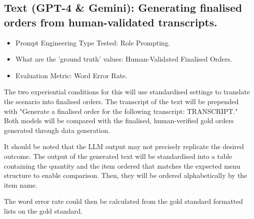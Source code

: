 
\subsection{Text (GPT-4 \& Gemini): Generating finalised orders from human-validated transcripts.}

\begin{itemize}
    \item Prompt Engineering Type Tested: Role Prompting.
    \item What are the 'ground truth' values: Human-Validated Finalised Orders.
    \item Evaluation Metric: Word Error Rate.
\end{itemize}

The two experiential conditions for this will use standardised settings to translate the scenario into finalised orders. The transcript of the text will be prepended with "Generate a finalised order for the following transcript: TRANSCRIPT." Both models will be compared with the finalised, human-verified gold orders generated through data generation. 

It should be noted that the LLM output may not precisely replicate the desired outcome. The output of the generated text will be standardised into a table containing the quantity and the item ordered that matches the expected menu structure to enable comparison. Then, they will be ordered alphabetically by the item name. 

The word error rate could then be calculated from the gold standard formatted lists on the gold standard. 